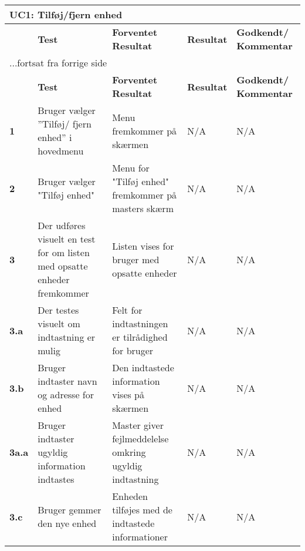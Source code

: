 \begin{center}
\begin{longtable}{|p{}|p{}|p{}|p{}|p{}|} %
\hline
\multicolumn{5}{|l|}{\textbf{UC1: Tilføj/fjern enhed}} \\ \hline
\multicolumn{1}{|c|}{} &
\textbf{Test} &
\textbf{Forventet \newline Resultat} &
\textbf{Resultat} &
\textbf{Godkendt/ \newline Kommentar} \\ \hline 
\endfirsthead

\multicolumn{5}{l}{...fortsat fra forrige side} \\ \hline 
\multicolumn{1}{|c|}{} &
\textbf{Test} &
\textbf{Forventet \newline Resultat} &
\textbf{Resultat} &
\textbf{Godkendt/ \newline Kommentar} \\ \hline 
\endhead


\textbf{1}	&Bruger vælger ''Tilføj/ fjern enhed'' i hovedmenu 
			&Menu fremkommer på skærmen 
			&N/A 
			&N/A \\\hline
			 
\textbf{2}	&Bruger vælger "Tilføj enhed" 
			&Menu for "Tilføj enhed" fremkommer på masters skærm  
			&N/A 
			&N/A \\\hline
			 
\textbf{3}	&Der udføres visuelt en test for om listen med opsatte enheder fremkommer
			&Listen vises for bruger med opsatte enheder
			&N/A 
			&N/A \\\hline
			 
\textbf{3.a}	&Der testes visuelt om indtastning er mulig
			&Felt for indtastningen er tilrådighed for bruger
			&N/A
			&N/A \\\hline 
			
\textbf{3.b}&Bruger indtaster navn og adresse for enhed
			&Den indtastede information vises på skærmen 
			&N/A 
			&N/A \\\hline
			
\textbf{3a.a}&Bruger indtaster ugyldig information indtastes
			&Master giver fejlmeddelelse omkring ugyldig indtastning
			&N/A 
			&N/A \\\hline
			 
\textbf{3.c}&Bruger gemmer den nye enhed
			&Enheden tilføjes med de indtastede informationer
			&N/A 
			&N/A \\\hline
			 

\end{longtable}
\end{center}
